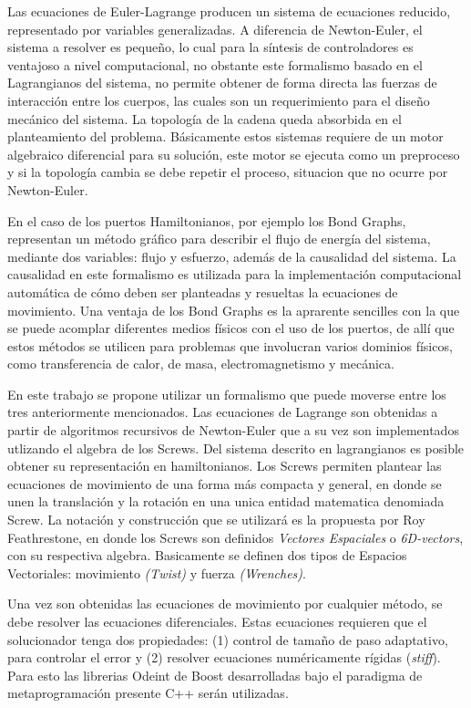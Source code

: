 \documentclass[journal,letterpaper,twoside,twocolumn]{IEEEtran}
\begin{document}
Las ecuaciones de Euler-Lagrange producen un sistema de ecuaciones reducido, representado por variables generalizadas. A diferencia de Newton-Euler, el sistema a resolver es pequeño, lo cual para la síntesis de controladores es ventajoso a nivel computacional, no obstante este formalismo basado en el Lagrangianos del sistema, no permite obtener de forma directa las fuerzas de interacción entre los cuerpos, las cuales son un requerimiento para el diseño mecánico del sistema. La topología de la cadena queda absorbida en el planteamiento del problema. Básicamente estos sistemas requiere de un motor algebraico diferencial para su solución, este motor se ejecuta como un preproceso y si la topología cambia se debe repetir el proceso, situacion que no ocurre por Newton-Euler.

En el caso de los puertos Hamiltonianos, por ejemplo los Bond Graphs, representan un método gráfico para describir el flujo de energía del sistema, mediante dos variables: flujo y esfuerzo, además de la causalidad del sistema. La causalidad en este formalismo es utilizada para la implementación computacional automática de cómo deben ser planteadas y resueltas la ecuaciones de movimiento. Una ventaja de los Bond Graphs es la aprarente sencilles con la que se puede acomplar diferentes medios físicos con el uso de los puertos, de allí que estos métodos se utilicen para problemas que involucran varios dominios físicos, como transferencia de calor, de masa, electromagnetismo y mecánica.

En este trabajo se propone utilizar un formalismo que puede moverse entre los tres anteriormente mencionados. Las ecuaciones de Lagrange son obtenidas a partir de algoritmos recursivos de Newton-Euler que a su vez son implementados utlizando el algebra de los Screws. Del sistema descrito en lagrangianos es posible obtener su representación en hamiltonianos. Los Screws permiten plantear las ecuaciones de movimiento de una forma más compacta y general, en donde se unen la translación y la rotación en una unica entidad matematica denomiada Screw. La notación y construcción que se utilizará es la propuesta por Roy Feathrestone, en donde los Screws son definidos \emph{Vectores Espaciales} o \emph{6D-vectors}, con su respectiva algebra. Basicamente se definen dos tipos de Espacios Vectoriales: movimiento \emph{(Twist)} y fuerza \emph{(Wrenches)}.

Una vez son obtenidas las ecuaciones de movimiento por cualquier método, se debe resolver las ecuaciones diferenciales. Estas ecuaciones requieren que el solucionador tenga dos propiedades: (1) control de tamaño de paso adaptativo, para controlar el error y (2) resolver ecuaciones numéricamente rígidas (\emph{stiff}). Para esto las librerias Odeint de Boost desarrolladas bajo el paradigma de metaprogramación presente C++ serán utilizadas.
\end{document}
